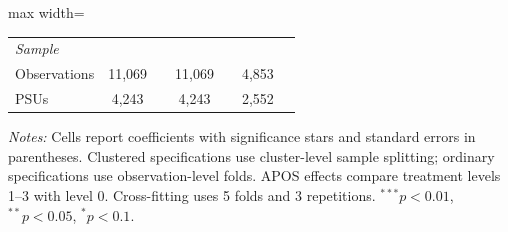 \begin{table}[htbp]
\begin{adjustbox}{max width=\linewidth}
\begin{tabular}{lcccccc}
\midrule
\multicolumn{7}{l}{\textit{Sample}} \\
Observations & 11,069 &  & 11,069 &  & 4,853 &  \\
PSUs & 4,243 &  & 4,243 &  & 2,552 &  \\
\hline\hline
\end{tabular}
\end{adjustbox}
\par\vspace{3pt}
\begin{minipage}{\linewidth}\scriptsize \textit{Notes:} Cells report coefficients with significance stars and standard errors in parentheses. Clustered specifications use cluster-level sample splitting; ordinary specifications use observation-level folds. APOS effects compare treatment levels 1--3 with level 0. Cross-fitting uses 5 folds and 3 repetitions. $^{***}p<0.01$, $^{**}p<0.05$, $^{*}p<0.1$.\end{minipage}
\end{table}